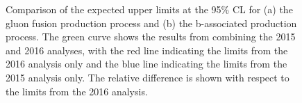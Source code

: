 \begin{figure}[h!]
\begin{center}
\end{center}
\caption[Comparison of the expected upper limits at the 95\% CL for the 
gluon fusion and b-associated production process, comparing the 2015 and 2016 analyses with a combination.]{Comparison of the expected upper limits at the 95\% \ac{CL} for (a) the gluon fusion production
process and (b) the b-associated production process. The green curve shows the results
from combining the 2015 and 2016 analyses,
with the red line indicating the limits from the 2016 analysis only
and the blue line indicating the limits from the 2015 analysis only.
The relative difference is shown with respect to the limits from the 2016 analysis.}%
\label{fig:mssm_results_combination_limits_comp}
\end{figure}
